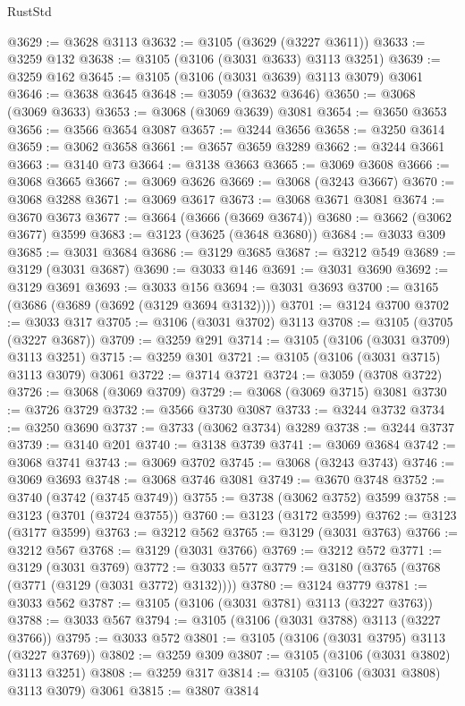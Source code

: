 \begin{lexlean}{RustStd}
\begin{coremodule}
@3629 := @3628 @3113
@3632 := @3105 (@3629 (@3227 @3611))
@3633 := @3259 @132
@3638 := @3105 (@3106 (@3031 @3633) @3113 @3251)
@3639 := @3259 @162
@3645 := @3105 (@3106 (@3031 @3639) @3113 @3079) @3061
@3646 := @3638 @3645
@3648 := @3059 (@3632 @3646)
@3650 := @3068 (@3069 @3633)
@3653 := @3068 (@3069 @3639) @3081
@3654 := @3650 @3653
@3656 := @3566 @3654 @3087
@3657 := @3244 @3656
@3658 := @3250 @3614
@3659 := @3062 @3658
@3661 := @3657 @3659 @3289
@3662 := @3244 @3661
@3663 := @3140 @73
@3664 := @3138 @3663
@3665 := @3069 @3608
@3666 := @3068 @3665
@3667 := @3069 @3626
@3669 := @3068 (@3243 @3667)
@3670 := @3068 @3288
@3671 := @3069 @3617
@3673 := @3068 @3671 @3081
@3674 := @3670 @3673
@3677 := @3664 (@3666 (@3669 @3674))
@3680 := @3662 (@3062 @3677) @3599
@3683 := @3123 (@3625 (@3648 @3680))
@3684 := @3033 @309
@3685 := @3031 @3684
@3686 := @3129 @3685
@3687 := @3212 @549
@3689 := @3129 (@3031 @3687)
@3690 := @3033 @146
@3691 := @3031 @3690
@3692 := @3129 @3691
@3693 := @3033 @156
@3694 := @3031 @3693
@3700 := @3165 (@3686 (@3689 (@3692 (@3129 @3694 @3132))))
@3701 := @3124 @3700
@3702 := @3033 @317
@3705 := @3106 (@3031 @3702) @3113
@3708 := @3105 (@3705 (@3227 @3687))
@3709 := @3259 @291
@3714 := @3105 (@3106 (@3031 @3709) @3113 @3251)
@3715 := @3259 @301
@3721 := @3105 (@3106 (@3031 @3715) @3113 @3079) @3061
@3722 := @3714 @3721
@3724 := @3059 (@3708 @3722)
@3726 := @3068 (@3069 @3709)
@3729 := @3068 (@3069 @3715) @3081
@3730 := @3726 @3729
@3732 := @3566 @3730 @3087
@3733 := @3244 @3732
@3734 := @3250 @3690
@3737 := @3733 (@3062 @3734) @3289
@3738 := @3244 @3737
@3739 := @3140 @201
@3740 := @3138 @3739
@3741 := @3069 @3684
@3742 := @3068 @3741
@3743 := @3069 @3702
@3745 := @3068 (@3243 @3743)
@3746 := @3069 @3693
@3748 := @3068 @3746 @3081
@3749 := @3670 @3748
@3752 := @3740 (@3742 (@3745 @3749))
@3755 := @3738 (@3062 @3752) @3599
@3758 := @3123 (@3701 (@3724 @3755))
@3760 := @3123 (@3172 @3599)
@3762 := @3123 (@3177 @3599)
@3763 := @3212 @562
@3765 := @3129 (@3031 @3763)
@3766 := @3212 @567
@3768 := @3129 (@3031 @3766)
@3769 := @3212 @572
@3771 := @3129 (@3031 @3769)
@3772 := @3033 @577
@3779 := @3180 (@3765 (@3768 (@3771 (@3129 (@3031 @3772) @3132))))
@3780 := @3124 @3779
@3781 := @3033 @562
@3787 := @3105 (@3106 (@3031 @3781) @3113 (@3227 @3763))
@3788 := @3033 @567
@3794 := @3105 (@3106 (@3031 @3788) @3113 (@3227 @3766))
@3795 := @3033 @572
@3801 := @3105 (@3106 (@3031 @3795) @3113 (@3227 @3769))
@3802 := @3259 @309
@3807 := @3105 (@3106 (@3031 @3802) @3113 @3251)
@3808 := @3259 @317
@3814 := @3105 (@3106 (@3031 @3808) @3113 @3079) @3061
@3815 := @3807 @3814

\end{coremodule}
\end{lexlean}
